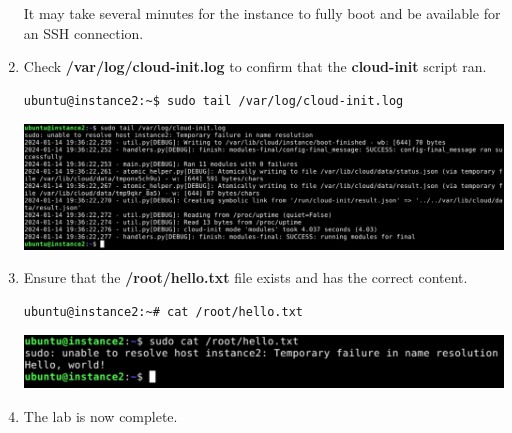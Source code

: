 \documentclass[letterpaper, 12pt]{article}
\begin{document}
\begin{enumerate}
    \begin{notebox}{}
        It may take several minutes for the instance to fully boot and be available for an SSH connection.
    \end{notebox}

    \item Check \textbf{/var/log/cloud-init.log} to confirm that the \textbf{cloud-init} script ran.
\begin{lstlisting}
ubuntu@instance2:~$ sudo tail /var/log/cloud-init.log
\end{lstlisting}

    \begin{center}
        \includegraphics[width=\linewidth]{images/part2/step6.png}
    \end{center}

    \item Ensure that the \textbf{/root/hello.txt} file exists and has the correct content.
\begin{lstlisting}
ubuntu@instance2:~# cat /root/hello.txt
\end{lstlisting}

    \begin{center}
        \includegraphics[width=\linewidth]{images/part2/step7.png}
    \end{center}

    \item The lab is now complete.

\end{enumerate}
\end{document}
